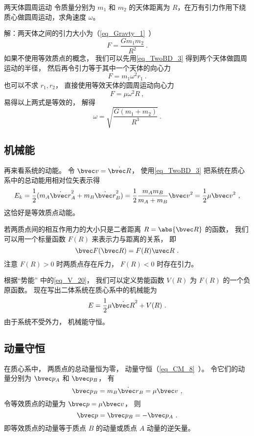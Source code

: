 \begin{example}{两天体圆周运动}
令质量分别为 $m_1$ 和 $m_2$ 的天体距离为 $R$，在万有引力作用下绕质心做圆周运动，求角速度 $\omega$。

解：两天体之间的引力大小为（\autoref{eq_Gravty_1}~）
\begin{equation}
F = \frac{Gm_1m_2}{R^2}~.
\end{equation}
如果不使用等效质点的概念， 我们可以先用\autoref{eq_TwoBD_3} 得到两个天体做圆周运动的半径， 然后再令引力等于其中一个天体的向心力
\begin{equation}
F = m_1 \omega^2 r_1~.
\end{equation}
也可以不求 $r_1, r_2$， 直接使用等效天体的圆周运动向心力
\begin{equation}
F = \mu \omega^2 R~,
\end{equation}
易得以上两式是等效的， 解得
\begin{equation}
\omega = \sqrt{\frac{G(m_1 + m_2)}{R^3}}~.
\end{equation}
\end{example}

\subsection{机械能}

再来看系统的动能。 令 $\bvec v = \dot {\bvec R}$， 使用\autoref{eq_TwoBD_3} 把系统在质心系中的总动能用相对位矢表示得
\begin{equation}
E_k = \frac12 (m_A \dot{\bvec r}_A^2 + m_B \dot{\bvec r}_B^2) = \frac12 \frac{m_A m_B}{m_A + m_B} {\bvec  v}^2 = \frac12 \mu {\bvec  v}^2~,
\end{equation}
这恰好是等效质点动能。

若两质点间的相互作用力的大小只是二者距离 $R = \abs{\bvec R}$ 的函数， 我们可以用一个标量函数 $F(R)$ 来表示力与距离的关系， 即
\begin{equation}
\bvec F(\bvec R) = F(R) \uvec R~.
\end{equation}
注意 $F(R)>0$ 时两质点存在斥力， $F(R)<0$ 时存在引力。

根据“势能” 中的\autoref{eq_V_20}， 我们可以定义势能函数 $V(R)$ 为 $F(R)$ 的一个负原函数。 现在写出二体系统在质心系中的机械能为
\begin{equation}
E = \frac12 \mu \dot{\bvec  R}^2 + V(R)~.
\end{equation}
由于系统不受外力， 机械能守恒。

\subsection{动量守恒}
在质心系中， 两质点的总动量恒为零， 动量守恒（\autoref{eq_CM_8}~）。 令它们的动量分别为 $\bvec p_A$ 和 $\bvec p_B$， 有
\begin{equation}\label{eq_TwoBD_10}
\bvec p_B = m_B \dot {\bvec r}_B = \mu \bvec v~,
\end{equation}
令等效质点的动量为 $\bvec p = \mu \bvec v$， 则
\begin{equation}\label{eq_TwoBD_11}
\bvec p = \bvec p_B = -\bvec p_A~.
\end{equation}
即等效质点的动量等于质点 $B$ 的动量或质点 $A$ 动量的逆矢量。

